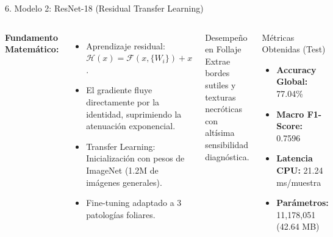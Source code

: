\documentclass[aspectratio=169,10pt]{beamer}
\begin{document}
\begin{frame}{6. Modelo 2: ResNet-18 (Residual Transfer Learning)}
    \begin{columns}
        \textbf{Fundamento Matemático:}
        \begin{itemize}
            \item Aprendizaje residual: $\mathcal{H}(x) = \mathcal{F}(x, \{W_i\}) + x$.
            \item El gradiente fluye directamente por la identidad, suprimiendo la atenuación exponencial.
            \item Transfer Learning: Inicialización con pesos de ImageNet (1.2M de imágenes generales).
            \item Fine-tuning adaptado a 3 patologías foliares.
        \end{itemize}

        \vspace{0.2cm}
        \begin{exampleblock}{Desempeño en Follaje}
            Extrae bordes sutiles y texturas necróticas con altísima sensibilidad diagnóstica.
        \end{exampleblock}

        \centering
        \begin{block}{Métricas Obtenidas (Test)}
            \begin{itemize}
                \item \textbf{Accuracy Global:} 77.04\%
                \item \textbf{Macro F1-Score:} 0.7596
                \item \textbf{Latencia CPU:} 21.24 ms/muestra
                \item \textbf{Parámetros:} 11,178,051 (42.64 MB)
            \end{itemize}
        \end{block}
    \end{columns}
\end{frame}
\end{document}
